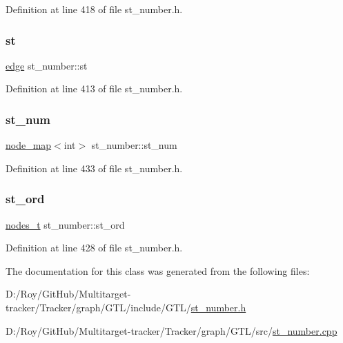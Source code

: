 Definition at line 418 of file st\+\_\+number.\+h.

\mbox{\label{classst__number_a58fe3a128f0d06ce17742b62d8eff1a8}} 
\subsubsection{\texorpdfstring{st}{st}}
{\footnotesize\ttfamily \mbox{\hyperlink{classedge}{edge}} st\+\_\+number\+::st\hspace{0.3cm}{\ttfamily [protected]}}



Definition at line 413 of file st\+\_\+number.\+h.

\mbox{\label{classst__number_ac3443aa6c9d11b990357d8ac1342cabc}} 
\subsubsection{\texorpdfstring{st\+\_\+num}{st\_num}}
{\footnotesize\ttfamily \mbox{\hyperlink{classnode__map}{node\+\_\+map}}$<$int$>$ st\+\_\+number\+::st\+\_\+num\hspace{0.3cm}{\ttfamily [protected]}}



Definition at line 433 of file st\+\_\+number.\+h.

\mbox{\label{classst__number_af2160b5e111fe3730b4f9f3f3d09f98f}} 
\subsubsection{\texorpdfstring{st\+\_\+ord}{st\_ord}}
{\footnotesize\ttfamily \mbox{\hyperlink{edge_8h_a22ac17689106ba21a84e7bc54d1199d6}{nodes\+\_\+t}} st\+\_\+number\+::st\+\_\+ord\hspace{0.3cm}{\ttfamily [protected]}}



Definition at line 428 of file st\+\_\+number.\+h.



The documentation for this class was generated from the following files\+:\begin{DoxyCompactItemize}
\item 
D\+:/\+Roy/\+Git\+Hub/\+Multitarget-\/tracker/\+Tracker/graph/\+G\+T\+L/include/\+G\+T\+L/\mbox{\hyperlink{st__number_8h}{st\+\_\+number.\+h}}\item 
D\+:/\+Roy/\+Git\+Hub/\+Multitarget-\/tracker/\+Tracker/graph/\+G\+T\+L/src/\mbox{\hyperlink{st__number_8cpp}{st\+\_\+number.\+cpp}}\end{DoxyCompactItemize}
